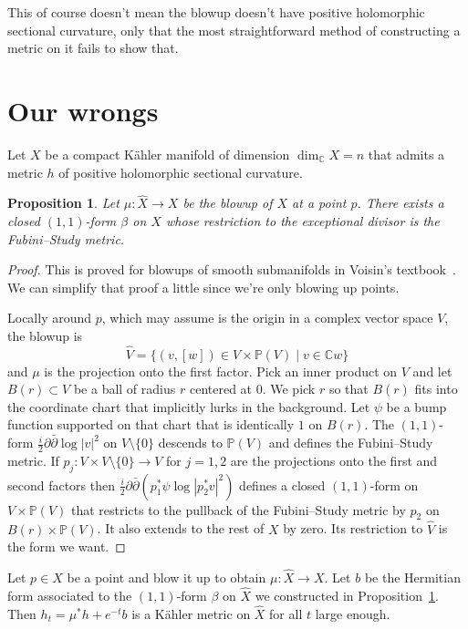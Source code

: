 \documentclass[10pt,a4paper]{amsart}
\newtheorem{prop}[theo]{Proposition}
\newcommand{\kk}[1]{\mathbb{#1}}
\def\hsc{holomorphic sectional curvature}
\def\bl#1{\widehat{#1}}
\begin{document}
This of course doesn't mean the blowup doesn't have positive \hsc{}, only that
the most straightforward method of constructing a metric on it fails to show that.




\section{Our wrongs}

Let $X$ be a compact K\"ahler manifold of dimension $\dim_{\kk C} X = n$ that
admits a metric $h$ of positive \hsc.



\begin{prop}
\label{prop:fs}
Let $\mu : \bl X \to X$ be the blowup of $X$ at a point $p$.
There exists a closed $(1,1)$-form $\beta$ on $X$ whose restriction to
the exceptional divisor is the Fubini--Study metric.
\end{prop}

\begin{proof}
This is proved for blowups of smooth submanifolds in
Voisin's textbook~\cite{voisin2002theorie}. We can simplify that proof a little
since we're only blowing up points.

Locally around $p$, which may assume is the origin in a complex vector space
$V$, the blowup is
$$
\bl V
= \{ (v,[w]) \in V \times \kk P(V) \mid v \in \kk C w \}
$$
and $\mu$ is the projection onto the first factor.
Pick an inner product on $V$ and let $B(r) \subset V$ be a ball of radius $r$
centered at $0$.
We pick $r$ so that $B(r)$ fits into the coordinate chart that implicitly lurks
in the background.
Let $\psi$ be a bump function supported on that chart that is identically $1$
on $B(r)$.
The $(1,1)$-form $\frac i2 \partial\bar\partial \log |v|^2$ on $V \setminus
\{0\}$ descends to $\kk P(V)$ and defines the Fubini--Study metric.
If $p_j : V \times V \setminus \{0\} \to V$ for $j = 1,2$ are the projections
onto the first and second factors then
$\frac i2 \partial \bar\partial (p_1^*\psi \log |p_2^*v|^2)$
defines a closed $(1,1)$-form on $V \times \kk P(V)$ that restricts to the
pullback of the Fubini--Study metric by $p_2$ on $B(r) \times \kk P(V)$.
It also extends to the rest of $X$ by zero.
Its restriction to $\bl V$ is the form we want.
\end{proof}




Let $p \in X$ be a point and blow it up to obtain $\mu : \bl X \to X$.
Let $b$ be the Hermitian form associated to the $(1,1)$-form $\beta$ on $\bl X$
we constructed in Proposition~\ref{prop:fs}.
Then $h_t = \mu^*h + e^{-t} b$ is a K\"ahler metric on $\bl X$ for all $t$ large
enough.
\end{document}
